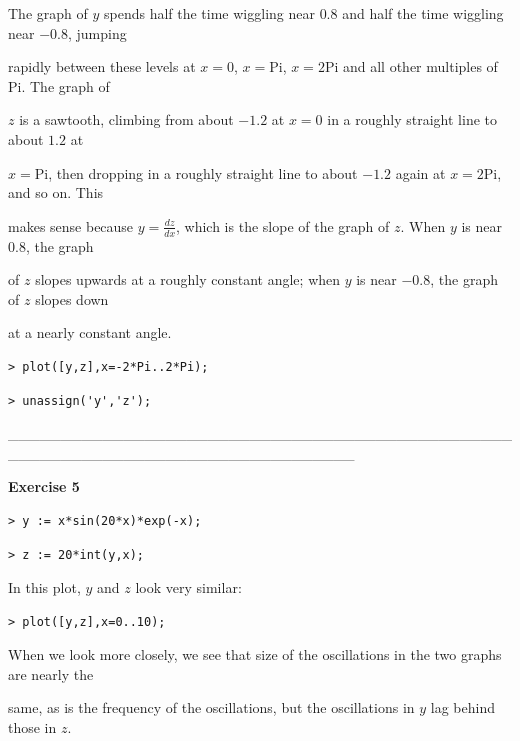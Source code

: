 \documentclass{article}
\begin{document}
\begin{Maple Normal}
The graph of 
$y$ spends half the time wiggling near 
$ 0.8$ and half the time wiggling near 
$- 0.8$, jumping\

rapidly between these levels at 
$x =0$, 
$x =\mathrm{Pi}$, 
$x =2 \mathrm{Pi}$ and all other multiples of 
$\mathrm{Pi}$.  The graph of\


$z$ is a sawtooth, climbing from about 
$- 1.2$ at 
$x =0$ in a roughly straight line to about 
$ 1.2$ at\


$x =\mathrm{Pi}$, then dropping in a roughly straight line to about 
$- 1.2$ again at 
$x =2 \mathrm{Pi}$, and so on.  This\

makes sense because 
$y =\frac{\mathit{dz}}{\mathit{dx}}$, which is the slope of the graph of 
$z$.  When 
$y$ is near 
$ 0.8$, the graph\

of 
$z$ slopes upwards at a roughly constant angle; when 
$y$ is near 
$- 0.8$, the graph of 
$z$ slopes down\

at a nearly constant angle. 
\end{Maple Normal}
\begin{lstlisting}
> plot([y,z],x=-2*Pi..2*Pi);
\end{lstlisting}
\begin{lstlisting}
> unassign('y','z');
\end{lstlisting}
\begin{Maple Normal}
\_\_\_\_\_\_\_\_\_\_\_\_\_\_\_\_\_\_\_\_\_\_\_\_\_\_\_\_\_\_\_\_\_\_\_\_\_\_\_\_\_\_\_\_\_\_\_\_\_\_\_\_\_\_\_\_\_\_\_\_\_\_\_\_\_\_\_\_\_\_\_\_\_\_\_\_\_\_\_\_\_
\end{Maple Normal}
\begin{Maple Normal}
\textbf{Exercise 5}
\end{Maple Normal}
\begin{lstlisting}
> y := x*sin(20*x)*exp(-x);
\end{lstlisting}
\begin{lstlisting}
> z := 20*int(y,x);
\end{lstlisting}
\begin{Maple Normal}
In this plot, 
$y$ and 
$z$ look very similar:
\end{Maple Normal}
\begin{lstlisting}
> plot([y,z],x=0..10);
\end{lstlisting}
\begin{Maple Normal}
When we look more closely, we see that size of the oscillations in the two graphs are nearly the\

same, as is the frequency of the oscillations, but the oscillations in 
$y$ lag behind those in 
$z$.
\end{Maple Normal}
\end{document}
